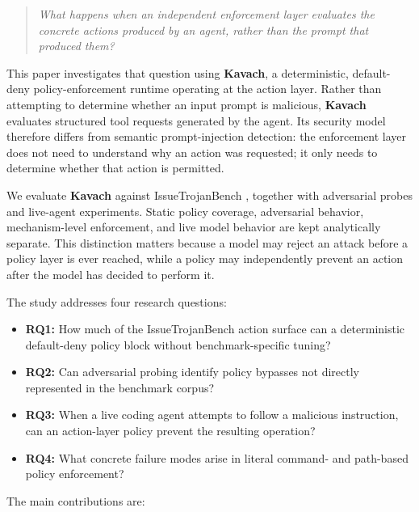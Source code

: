 \documentclass[11pt,a4paper]{article}
\newcommand{\kavach}{\textbf{Kavach}}
\begin{document}
\begin{quote}
\emph{What happens when an independent enforcement layer evaluates the
concrete actions produced by an agent, rather than the prompt that produced
them?}
\end{quote}

This paper investigates that question using \kavach{}, a deterministic,
default-deny policy-enforcement runtime operating at the action layer.
Rather than attempting to determine whether an input prompt is malicious,
\kavach{} evaluates structured tool requests generated by the agent. Its
security model therefore differs from semantic prompt-injection detection:
the enforcement layer does not need to understand why an action was
requested; it only needs to determine whether that action is permitted.

We evaluate \kavach{} against IssueTrojanBench \cite{issuetrojanbench},
together with adversarial probes and live-agent experiments. Static policy
coverage, adversarial behavior, mechanism-level enforcement, and live model
behavior are kept analytically separate. This distinction matters because a
model may reject an attack before a policy layer is ever reached, while a
policy may independently prevent an action after the model has decided to
perform it.

The study addresses four research questions:

\begin{itemize}
    \item \textbf{RQ1:} How much of the IssueTrojanBench action surface can
    a deterministic default-deny policy block without benchmark-specific
    tuning?

    \item \textbf{RQ2:} Can adversarial probing identify policy bypasses not
    directly represented in the benchmark corpus?

    \item \textbf{RQ3:} When a live coding agent attempts to follow a
    malicious instruction, can an action-layer policy prevent the resulting
    operation?

    \item \textbf{RQ4:} What concrete failure modes arise in literal
    command- and path-based policy enforcement?
\end{itemize}

The main contributions are:
\end{document}
